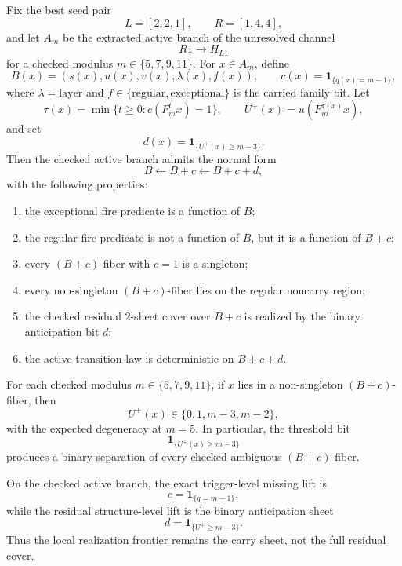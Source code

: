 
\begin{theorem}
Fix the best seed pair
\[
L=[2,2,1],\qquad R=[1,4,4],
\]
and let $A_m$ be the extracted active branch of the unresolved channel
\[
R1 \to H_{L1}
\]
for a checked modulus $m\in\{5,7,9,11\}$. For $x\in A_m$, define
\[
B(x)=(s(x),u(x),v(x),\lambda(x),f(x)),
\qquad
c(x)=\mathbf 1_{\{q(x)=m-1\}},
\]
where $\lambda=\mathrm{layer}$ and $f\in\{\mathrm{regular},\mathrm{exceptional}\}$ is the carried family bit. Let
\[
\tau(x)=\min\{t\ge 0: c(F_m^t x)=1\},
\qquad
U^+(x)=u(F_m^{\tau(x)}x),
\]
and set
\[
d(x)=\mathbf 1_{\{U^+(x)\ge m-3\}}.
\]
Then the checked active branch admits the normal form
\[
B \leftarrow B+c \leftarrow B+c+d,
\]
with the following properties:
\begin{enumerate}
\item the exceptional fire predicate is a function of $B$;
\item the regular fire predicate is not a function of $B$, but it is a function of $B+c$;
\item every $(B+c)$-fiber with $c=1$ is a singleton;
\item every non-singleton $(B+c)$-fiber lies on the regular noncarry region;
\item the checked residual $2$-sheet cover over $B+c$ is realized by the binary anticipation bit $d$;
\item the active transition law is deterministic on $B+c+d$.
\end{enumerate}
\end{theorem}

\begin{lemma}
For each checked modulus $m\in\{5,7,9,11\}$, if $x$ lies in a non-singleton $(B+c)$-fiber, then
\[
U^+(x)\in\{0,1,m-3,m-2\},
\]
with the expected degeneracy at $m=5$. In particular, the threshold bit
\[
\mathbf 1_{\{U^+(x)\ge m-3\}}
\]
produces a binary separation of every checked ambiguous $(B+c)$-fiber.
\end{lemma}

\begin{corollary}
On the checked active branch, the exact trigger-level missing lift is
\[
c=\mathbf 1_{\{q=m-1\}},
\]
while the residual structure-level lift is the binary anticipation sheet
\[
d=\mathbf 1_{\{U^+\ge m-3\}}.
\]
Thus the local realization frontier remains the carry sheet, not the full residual cover.
\end{corollary}
